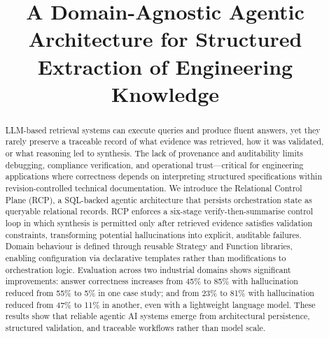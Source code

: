 \documentclass[largeformat]{interact}
\begin{document}
\title{A Domain-Agnostic Agentic Architecture for Structured Extraction of Engineering Knowledge}
\author{
}
\maketitle
\begin{abstract}
    LLM-based retrieval systems can execute queries and produce fluent answers, yet they rarely preserve a traceable record of what evidence was retrieved, how it was validated, or what reasoning led to synthesis.
    The lack of provenance and auditability limits debugging, compliance verification, and operational trust—critical for engineering applications where correctness depends on interpreting structured specifications within revision-controlled technical documentation. 
    We introduce the Relational Control Plane (RCP), a SQL-backed agentic architecture that persists orchestration state as queryable relational records. RCP enforces a six-stage verify-then-summarise control loop in which synthesis is permitted only after retrieved evidence satisfies validation constraints, transforming potential hallucinations into explicit, auditable failures. Domain behaviour is defined through reusable Strategy and Function libraries, enabling configuration via declarative templates rather than modifications to orchestration logic.
    Evaluation across two industrial domains shows significant improvements: answer correctness increases from 45\% to 85\% with hallucination reduced from 55\% to 5\% in one case study; and from 23\% to 81\% with hallucination reduced from 47\% to 11\% in another, even with a lightweight language model. These results show that reliable agentic AI systems emerge from architectural persistence, structured validation, and traceable workflows rather than model scale.
\end{abstract}
\end{document}
